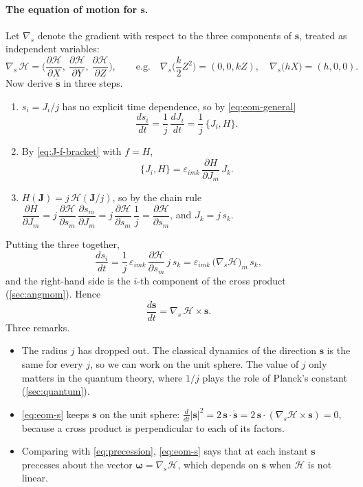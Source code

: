 \documentclass[11pt,a4paper]{article}
\newcommand{\vs}{\bm{s}}
\newcommand{\vJ}{\bm{J}}
\newcommand{\PB}[2]{\{#1,#2\}}
\begin{document}
\paragraph{The equation of motion for $\vs$.} Let $\nabla_{\!s}$ denote the gradient with respect to the three
components of $\vs$, treated as independent variables:
\begin{equation*}
  \nabla_{\!s}\, \mathcal H = \Big(\frac{\partial \mathcal H}{\partial X},\ \frac{\partial \mathcal H}{\partial Y},\ \frac{\partial \mathcal H}{\partial Z}\Big),
  \qquad\text{e.g.}\quad \nabla_{\!s}\Big(\frac k2 Z^2\Big) = (0, 0, kZ),\quad \nabla_{\!s}\big(hX\big) = (h, 0, 0).
\end{equation*}
Now derive $\dot{\vs}$ in three steps.
\begin{enumerate}
  \item $s_i = J_i/j$ has no explicit time dependence, so by \eqref{eq:eom-general}
  \[ \frac{ds_i}{dt} = \frac1j\,\frac{dJ_i}{dt} = \frac1j\,\PB{J_i}{H}. \]
  \item By \eqref{eq:J-f-bracket} with $f = H$,
  \[ \PB{J_i}{H} = \varepsilon_{imk}\,\frac{\partial H}{\partial J_m}\,J_k . \]
  \item $H(\vJ) = j\,\mathcal H(\vJ/j)$, so by the chain rule $\dfrac{\partial H}{\partial J_m} = j\,\dfrac{\partial \mathcal H}{\partial
  s_m}\,\dfrac{\partial s_m}{\partial J_m} = j\,\dfrac{\partial \mathcal H}{\partial s_m}\,\dfrac1j = \dfrac{\partial \mathcal H}{\partial
  s_m}$, and $J_k = j\,s_k$.
\end{enumerate}
Putting the three together,
\begin{equation*}
  \frac{ds_i}{dt} = \frac1j\,\varepsilon_{imk}\,\frac{\partial \mathcal H}{\partial s_m}\, j\,s_k
                 = \varepsilon_{imk}\,\big(\nabla_{\!s} \mathcal H\big)_m\, s_k ,
\end{equation*}
and the right-hand side is the $i$-th component of the cross product (\cref{sec:angmom}). Hence
\begin{equation}\label{eq:eom-s}
  \boxed{\frac{d\vs}{dt} = \nabla_{\!s}\, \mathcal H \times \vs .}
\end{equation}
Three remarks.
\begin{itemize}
  \item The radius $j$ has dropped out. The classical dynamics of the direction $\vs$ is the same for every $j$, so we
  can work on the unit sphere. The value of $j$ only matters in the quantum theory, where $1/j$ plays the role of
  Planck's constant (\cref{sec:quantum}).
  \item \eqref{eq:eom-s} keeps $\vs$ on the unit sphere: $\frac{d}{dt}|\vs|^2 = 2\,\vs\cdot\dot{\vs} = 2\,\vs\cdot
  (\nabla_{\!s} \mathcal H\times\vs) = 0$, because a cross product is perpendicular to each of its factors.
  \item Comparing with \eqref{eq:precession}, \eqref{eq:eom-s} says that at each instant $\vs$ precesses about the
  vector $\bm\omega = \nabla_{\!s} \mathcal H$, which depends on $\vs$ when $\mathcal H$ is not linear.
\end{itemize}
\end{document}
